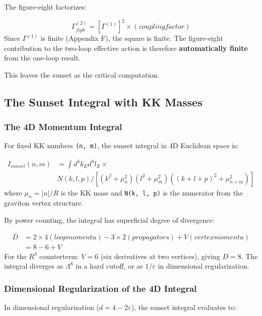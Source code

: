 \documentclass[aps,prd,preprint,superscriptaddress,longbibliography,floatfix]{revtex4-2}
\theoremstyle{remark}
\begin{document}
The figure-eight factorizes:


\begin{equation}
    \Gamma^{(2)}_{fig8} = [\Gamma^{(1)}]^{2} \times (coupling factor)
\end{equation}
Since $\Gamma^{(1)}$ is finite (Appendix F), the square is finite. The figure-eight contribution to the two-loop effective action is therefore \textbf{automatically finite} from the one-loop result.

This leaves the sunset as the critical computation.



\subsection{The Sunset Integral with KK Masses}


\subsubsection{The 4D Momentum Integral}

For fixed KK numbers \texttt{(n, m)}, the sunset integral in 4D Euclidean space is:


\begin{align}
    I_{sunset}(n, m) &= \int d^{4}k_E d^{4}l_E \times \\
    & N(k, l, p) / [(k^{2} + \mu_n^{2})(l^{2} + \mu_m^{2})((k+l+p)^{2} + \mu_{n+m}^{2})]
\end{align}
where $\mu_n = |n|/R$ is the KK mass and \texttt{N(k, l, p)} is the numerator from the graviton vertex structure.

By power counting, the integral has superficial degree of divergence:


\begin{align}
    D &= 2 \times 4 (loop momenta) - 3 \times 2 (propagators) + V (vertex momenta) \\
    & = 8 - 6 + V
\end{align}
For the $R^{3}$ counterterm: $V = 6$ (six derivatives at two vertices), giving $D = 8$. The integral diverges as $\Lambda^{8}$ in a hard cutoff, or as $1/\varepsilon$ in dimensional regularization.


\subsubsection{Dimensional Regularization of the 4D Integral}

In dimensional regularization ($d = 4 - 2\varepsilon$), the sunset integral evaluates to:
\end{document}
